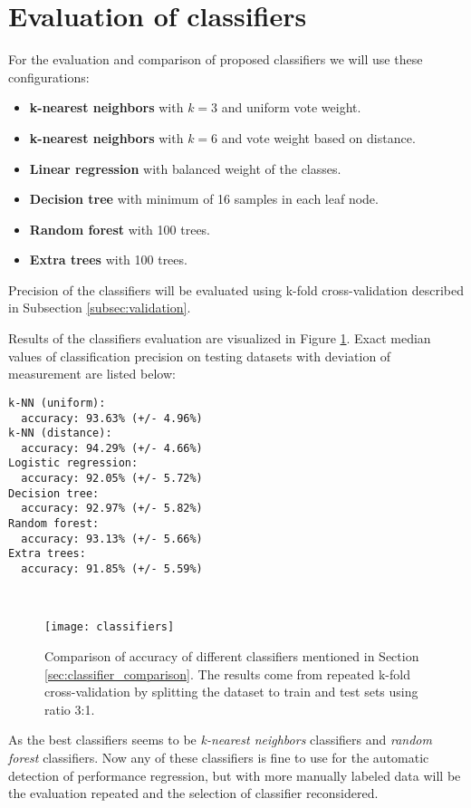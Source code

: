 \section{Evaluation of classifiers}
For the evaluation and comparison of proposed classifiers we will use these
configurations:
\begin{itemize}
\item \textbf{k-nearest neighbors} with $k=3$ and uniform vote weight.
\item \textbf{k-nearest neighbors} with $k=6$ and vote weight based on distance.
\item \textbf{Linear regression} with balanced weight of the classes.
\item \textbf{Decision tree} with minimum of 16 samples in each leaf node.
\item \textbf{Random forest} with 100 trees.
\item \textbf{Extra trees} with 100 trees.
\end{itemize}

Precision of the classifiers will be evaluated using k-fold cross-validation
described in Subsection \ref{subsec:validation}.

Results of the classifiers evaluation are visualized in Figure
\ref{fig:classifiers}. Exact median values of classification precision on
testing datasets with deviation of measurement are listed below:

\begin{minipage}{\linewidth}
\begin{verbatim}
k-NN (uniform):
  accuracy: 93.63% (+/- 4.96%)
k-NN (distance):
  accuracy: 94.29% (+/- 4.66%)
Logistic regression:
  accuracy: 92.05% (+/- 5.72%)
Decision tree:
  accuracy: 92.97% (+/- 5.82%)
Random forest:
  accuracy: 93.13% (+/- 5.66%)
Extra trees:
  accuracy: 91.85% (+/- 5.59%)
\end{verbatim}
\end{minipage}\\

\begin{figure}
  \centering
  \texttt{[image: classifiers]}
  \caption{Comparison of accuracy of different classifiers mentioned in Section
    \ref{sec:classifier_comparison}. The results come from repeated k-fold
    cross-validation by splitting the dataset to train and test sets using ratio
    3:1.}
  \label{fig:classifiers}
\end{figure}

As the best classifiers seems to be \emph{k-nearest neighbors} classifiers and
\emph{random forest} classifiers. Now any of these classifiers is fine to use
for the automatic detection of performance regression, but with more manually
labeled data will be the evaluation repeated and the selection of classifier
reconsidered.



